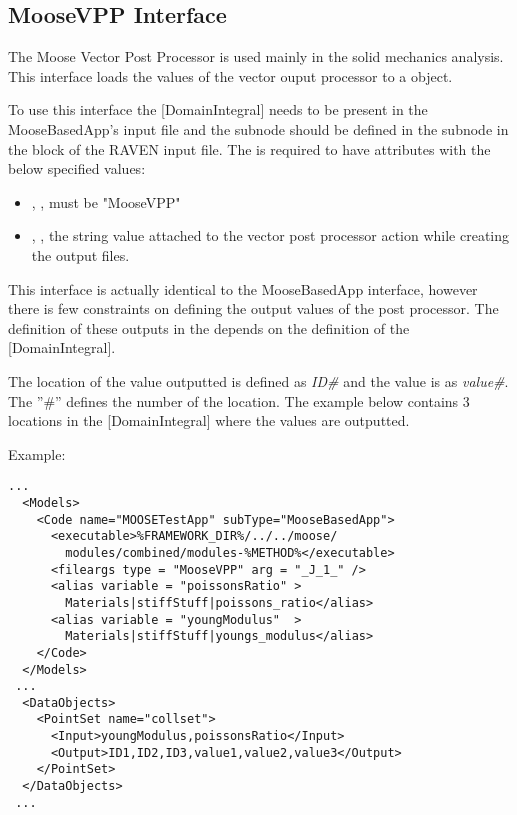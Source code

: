 \subsection{MooseVPP Interface}

The Moose Vector Post Processor is used mainly in the solid mechanics analysis.
This interface loads the values of the vector ouput processor to a  object.

To use this interface the [DomainIntegral] needs to be present in the MooseBasedApp's
 input file and the subnode  should be defined in the subnode  in
 the  block of the RAVEN input file. The  is required to have attributes with
the below specified values:

\begin{itemize}
    \item {}, , must be "MooseVPP"
    \item {}, , the string value attached to the vector post processor action
         while creating the output files.
\end{itemize}

This interface is actually identical to the MooseBasedApp interface, however there is
 few constraints on defining the output values of the post processor.
The definition of these outputs in the  depends on the definition of
 the [DomainIntegral].

The location of the value outputted is defined as \textit{ID\#} and the value is as
\textit{value\#}. The ''\#'' defines
the number of the location. The example below contains 3 locations in the [DomainIntegral]
where the values are outputted.

%
Example:
\begin{lstlisting}[style=XML]
 ...
  <Models>
    <Code name="MOOSETestApp" subType="MooseBasedApp">
      <executable>%FRAMEWORK_DIR%/../../moose/
        modules/combined/modules-%METHOD%</executable>
      <fileargs type = "MooseVPP" arg = "_J_1_" />
      <alias variable = "poissonsRatio" >
        Materials|stiffStuff|poissons_ratio</alias>
      <alias variable = "youngModulus"  >
        Materials|stiffStuff|youngs_modulus</alias>
    </Code>
  </Models>
 ...
  <DataObjects>
    <PointSet name="collset">
      <Input>youngModulus,poissonsRatio</Input>
      <Output>ID1,ID2,ID3,value1,value2,value3</Output>
    </PointSet>
  </DataObjects>
 ...
\end{lstlisting}




